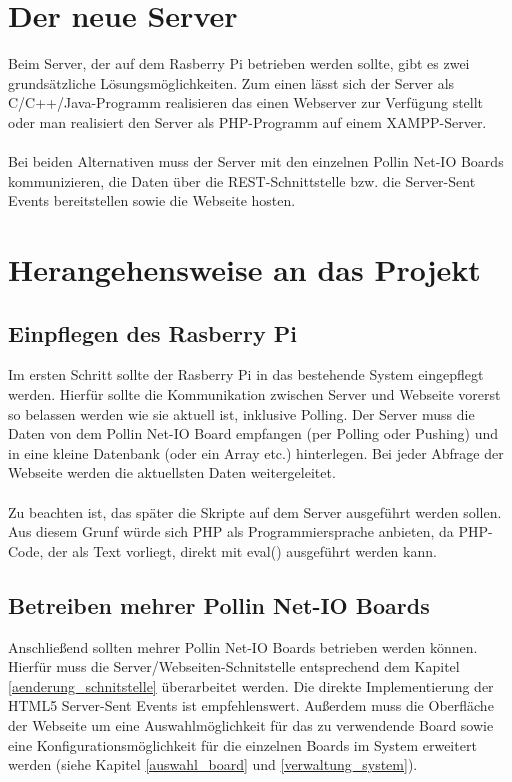 \section{Der neue Server}
Beim Server, der auf dem Rasberry Pi betrieben werden sollte, gibt es zwei
grundsätzliche Lösungsmöglichkeiten. Zum einen lässt sich der Server als
C/C++/Java-Programm realisieren das einen Webserver zur Verfügung stellt oder
man realisiert den Server als PHP-Programm auf einem XAMPP-Server.\\
\\
Bei beiden Alternativen muss der Server mit den einzelnen Pollin Net-IO Boards
kommunizieren, die Daten über die REST-Schnittstelle bzw. die Server-Sent Events
bereitstellen sowie die Webseite hosten.

\section{Herangehensweise an das Projekt}
\subsection{Einpflegen des Rasberry Pi}
Im ersten Schritt sollte der Rasberry Pi in das bestehende System eingepflegt
werden. Hierfür sollte die Kommunikation zwischen Server und Webseite vorerst so
belassen werden wie sie aktuell ist, inklusive Polling. Der Server muss die
Daten von dem Pollin Net-IO Board empfangen (per Polling oder Pushing) und in
eine kleine Datenbank (oder ein Array etc.) hinterlegen. Bei jeder Abfrage der
Webseite werden die aktuellsten Daten weitergeleitet.\\
\\
Zu beachten ist, das später die Skripte auf dem Server ausgeführt werden sollen.
Aus diesem Grunf würde sich PHP als Programmiersprache anbieten, da PHP-Code,
der als Text vorliegt, direkt mit \textrm{eval()} ausgeführt werden kann.

\subsection{Betreiben mehrer Pollin Net-IO Boards}
Anschließend sollten mehrer Pollin Net-IO Boards betrieben werden können.
Hierfür muss die Server/Webseiten-Schnitstelle entsprechend dem Kapitel
\ref{aenderung_schnitstelle} überarbeitet werden. Die direkte Implementierung
der HTML5 Server-Sent Events ist empfehlenswert. Außerdem muss die Oberfläche
der Webseite um eine Auswahlmöglichkeit für das zu verwendende Board sowie eine
Konfigurationsmöglichkeit für die einzelnen Boards im System erweitert werden
(siehe Kapitel \ref{auswahl_board} und \ref{verwaltung_system}).

